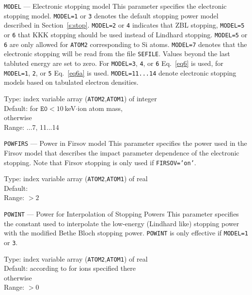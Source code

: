\begin{keydescription}{\texttt{MODEL} --- Electronic stopping model}
%
  This parameter specifies the electronic stopping model.  \texttt{MODEL=1} or
  \texttt{3} denotes the default stopping power model described in
  Section~\ref{s:stop}. \texttt{MODEL=2} or \texttt{4} indicates that ZBL
  stopping, \texttt{MODEL=5} or \texttt{6} that KKK stopping should be used
  instead of Lindhard stopping. \texttt{MODEL=5} or \texttt{6} are only allowed
  for \texttt{ATOM2} corresponding to Si atoms. \texttt{MODEL=7} denotes that
  the electronic stopping will be read from the file \texttt{SEFILE}. Values
  beyond the last tabluted energy are set to zero. For \texttt{MODEL=3},
  \texttt{4}, or \texttt{6} Eq.~\ref{eq6} is used, for \texttt{MODEL=1},
  \texttt{2}, or \texttt{5} Eq.~\ref{eq6a} is used. 
%
  \ifprivate
  \texttt{MODEL=11...14} denote electronic stopping models based on
  tabulated electron densities.
  \fi 
  \begin{keytab}
    Type:    \> index variable array (\texttt{ATOM2},\texttt{ATOM1}) 
                of integer \\
    Default:  for $\texttt{E0} < 10~$keV$\cdot$ion atom mass, \\
              otherwise \\
    Range:   ...7\ifprivate , 11...14 \fi
  \end{keytab}
\end{keydescription}

\begin{keydescription}{\texttt{POWFIRS} --- Power in Firsov model}
%
  This parameter specifies the power used in the Firsov model that
  describes the impact parameter dependence of the electronic stopping.
  Note that Firsov stopping is only used if \texttt{FIRSOV='on'}.
  \begin{keytab}
    Type:    \> index variable array (\texttt{ATOM2},\texttt{ATOM1}) 
                of real \\
    Default:  \\
    Range:   \> $> 2$
  \end{keytab}
\end{keydescription}

\begin{keydescription}{\texttt{POWINT} --- Power for Interpolation of 
    Stopping Powers}
%
  This parameter specifies the constant used to interpolate the
  low-energy (Lindhard like) stopping power with the modified Bethe
  Bloch stopping power.  \texttt{POWINT} is only effective if
  \texttt{MODEL=1} or \texttt{3}.
  \begin{keytab}
    Type:    \> index variable array (\texttt{ATOM2},\texttt{ATOM1}) 
                of real \\
    Default: \> according to \cite{I0104} for ions specified there \\
              otherwise \\
    Range:   \> $> 0$
  \end{keytab}
\end{keydescription}

